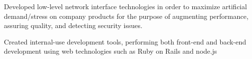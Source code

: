 \documentclass[10pt,a4paper]{altacv}
\begin{document}

\begin{fullwidth}
\makecvheader
\end{fullwidth}



Developed low-level network interface technologies in order to maximize artificial 
demand/stress on company products for the purpose of augmenting performance, 
assuring quality, and detecting security issues.

\divider

Created internal-use development tools, performing both front-end and back-end 
development using web technologies such as Ruby on Rails and node.js

\divider
\end{document}
